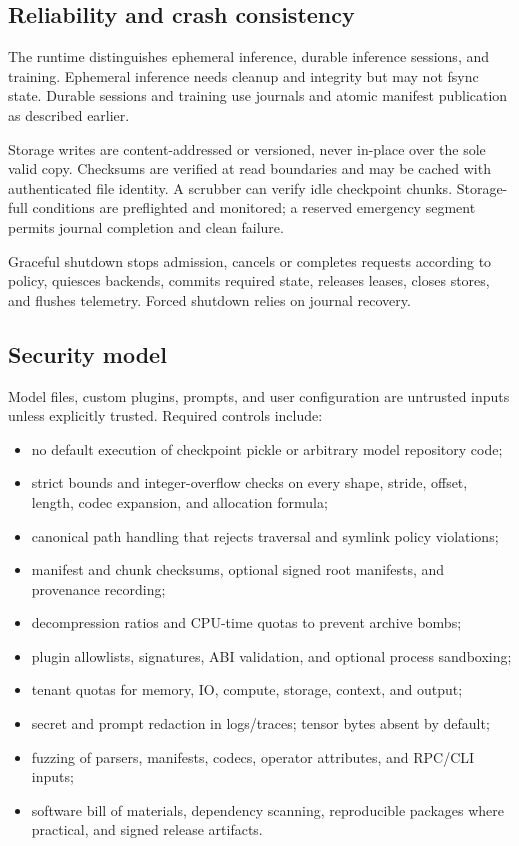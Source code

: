 \subsection{Reliability and crash consistency}

The runtime distinguishes ephemeral inference, durable inference sessions, and training. Ephemeral inference needs cleanup and integrity but may not fsync state. Durable sessions and training use journals and atomic manifest publication as described earlier.

Storage writes are content-addressed or versioned, never in-place over the sole valid copy. Checksums are verified at read boundaries and may be cached with authenticated file identity. A scrubber can verify idle checkpoint chunks. Storage-full conditions are preflighted and monitored; a reserved emergency segment permits journal completion and clean failure.

Graceful shutdown stops admission, cancels or completes requests according to policy, quiesces backends, commits required state, releases leases, closes stores, and flushes telemetry. Forced shutdown relies on journal recovery.

\subsection{Security model}

Model files, custom plugins, prompts, and user configuration are untrusted inputs unless explicitly trusted. Required controls include:

\begin{itemize}
  \item no default execution of checkpoint pickle or arbitrary model repository code;
  \item strict bounds and integer-overflow checks on every shape, stride, offset, length, codec expansion, and allocation formula;
  \item canonical path handling that rejects traversal and symlink policy violations;
  \item manifest and chunk checksums, optional signed root manifests, and provenance recording;
  \item decompression ratios and CPU-time quotas to prevent archive bombs;
  \item plugin allowlists, signatures, ABI validation, and optional process sandboxing;
  \item tenant quotas for memory, IO, compute, storage, context, and output;
  \item secret and prompt redaction in logs/traces; tensor bytes absent by default;
  \item fuzzing of parsers, manifests, codecs, operator attributes, and RPC/CLI inputs;
  \item software bill of materials, dependency scanning, reproducible packages where practical, and signed release artifacts.
\end{itemize}

